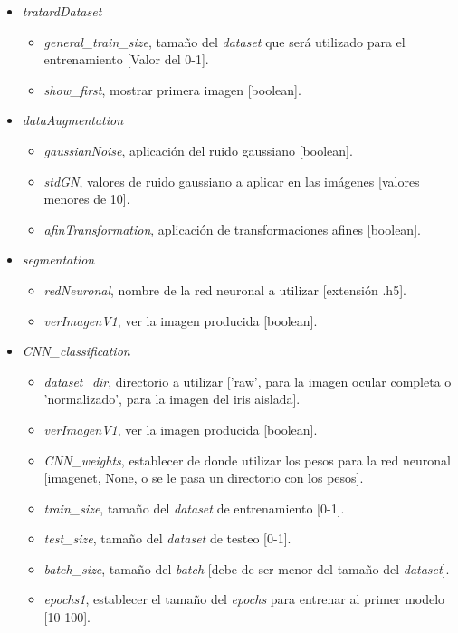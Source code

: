 {\begin{itemize}
    \item \textit{tratardDataset}
    \begin{itemize}
        \item \textit{general\_train\_size}, tamaño del \textit{dataset} que será utilizado para el entrenamiento [Valor del 0-1].
        \item \textit{show\_first}, mostrar primera imagen [boolean].
    \end{itemize}
    \item \textit{dataAugmentation}
    \begin{itemize}
        \item \textit{gaussianNoise}, aplicación del ruido gaussiano [boolean].
        \item \textit{stdGN}, valores de ruido gaussiano a aplicar en las imágenes [valores menores de 10].
        \item \textit{afinTransformation}, aplicación de transformaciones afines [boolean].
    \end{itemize}
    \item \textit{segmentation}
    \begin{itemize}
        \item \textit{redNeuronal}, nombre de la red neuronal a utilizar [extensión .h5].
        \item \textit{verImagenV1}, ver la imagen producida [boolean].
    \end{itemize}
    \item \textit{CNN\_classification}
    \begin{itemize}
        \item \textit{dataset\_dir}, directorio a utilizar ['raw', para la imagen ocular completa o 'normalizado', para la imagen del iris aislada].
        \item \textit{verImagenV1}, ver la imagen producida [boolean].
        \item \textit{CNN\_weights}, establecer de donde utilizar los pesos para la red neuronal [imagenet, None, o se le pasa un directorio con los pesos].
        \item \textit{train\_size}, tamaño del \textit{dataset} de entrenamiento [0-1].
        \item \textit{test\_size}, tamaño del \textit{dataset} de testeo [0-1].
        \item \textit{batch\_size}, tamaño del \textit{batch} [debe de ser menor del tamaño del \textit{dataset}].
        \item \textit{epochs1}, establecer el tamaño del \textit{epochs} para entrenar al primer modelo [10-100].

\end{itemize}
\end{itemize}}
